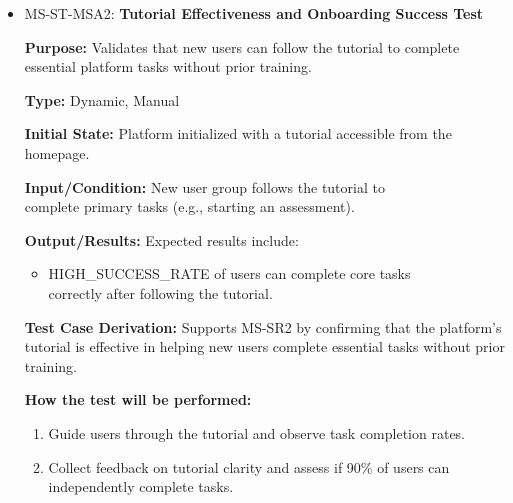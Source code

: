 \documentclass[12pt, titlepage]{article}
\begin{document}
\begin{itemize}
  \item MS-ST-MSA2: \textbf{Tutorial Effectiveness and Onboarding Success Test}
  \begin{mdframed}[linewidth=0.5mm] 
    \textbf{Purpose:} Validates that new users can follow the tutorial to complete essential platform tasks without prior training. \par
    \textbf{Type:} Dynamic, Manual \par 
    \textbf{Initial State:} Platform initialized with a tutorial accessible from the homepage. \par 
    \textbf{Input/Condition:} New user group follows the tutorial to \\complete primary tasks (e.g., starting an assessment). \par 
    \textbf{Output/Results:} Expected results include: 
    \begin{itemize} 
      \item HIGH\_SUCCESS\_RATE of users can complete core tasks \\correctly after following the tutorial. 
    \end{itemize} \par
    \textbf{Test Case Derivation:} Supports MS-SR2 by confirming that the platform’s tutorial is effective in helping new users complete essential tasks without prior training. \par
    \textbf{How the test will be performed:} 
    \begin{enumerate}[noitemsep] 
      \item Guide users through the tutorial and observe task completion rates. 
      \item Collect feedback on tutorial clarity and assess if 90\% of users can independently complete tasks. 
    \end{enumerate} 
  \end{mdframed}


\end{itemize}
\end{document}
